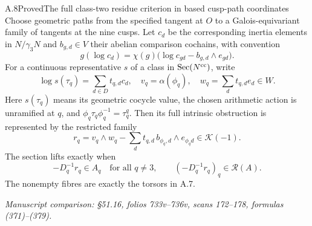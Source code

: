 \begin{statement}{A.8}{Proved}{The full class-two residue criterion in based cusp-path coordinates}
Choose geometric paths from the specified tangent at $O$ to a
Galois-equivariant family of tangents at the nine cusps. Let $c_d$
be the corresponding inertia elements in $N/\gamma_3N$ and
$b_{g,d}\in V$ their abelian comparison cochains, with convention
\[
 g(\log c_d)=\chi(g)\bigl(\log c_{gd}
                         -b_{g,d}\wedge e_{gd}\bigr).
 \tag{A.8.1}
\]
For a continuous representative $s$ of a class in
$\operatorname{Sec}(N^{\rm cc})$, write
\[
 \log s(\tau_q)=\sum_{d\in D}t_{q,d}c_d,\quad
 v_q=\alpha(\phi_q),\quad
 w_q=\sum_dt_{q,d}e_d\in W.
 \tag{A.8.2}
\]
Here $s(\tau_q)$ means its geometric cocycle value, the chosen
arithmetic action is unramified at $q$, and $\phi_q\tau_q\phi_q^{-1}
=\tau_q^q$. Then its full intrinsic obstruction is represented by
the restricted family
\[
 r_q=v_q\wedge w_q-
            \sum_dt_{q,d}\,b_{\phi_q,d}\wedge e_{\phi_qd}
       \in\mathcal K(-1).
 \tag{A.8.3}
\]
The section lifts exactly when
\[
 -D_q^{-1}r_q\in A_q\quad\text{for all }q\ne3,
 \qquad (-D_q^{-1}r_q)_q\in\mathcal R(A).
 \tag{A.8.4}
\]
The nonempty fibres are exactly the torsors in A.7.
\par\smallskip\noindent\emph{Manuscript comparison: \S51.16,
folios 733v--736v, scans 172--178, formulas (371)--(379).}
\end{statement}
